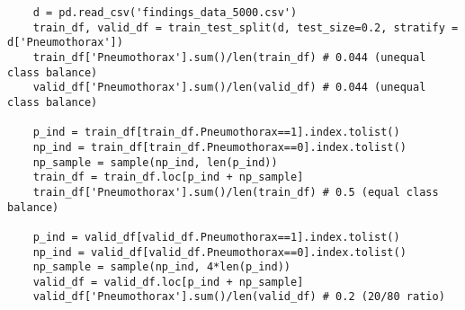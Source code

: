 \documentclass[11pt, a4paper]{article}
\begin{document}
	\begin{lstlisting}
	d = pd.read_csv('findings_data_5000.csv')
	train_df, valid_df = train_test_split(d, test_size=0.2, stratify = d['Pneumothorax'])
	train_df['Pneumothorax'].sum()/len(train_df) # 0.044 (unequal class balance)
	valid_df['Pneumothorax'].sum()/len(valid_df) # 0.044 (unequal class balance)
	
	p_ind = train_df[train_df.Pneumothorax==1].index.tolist()
	np_ind = train_df[train_df.Pneumothorax==0].index.tolist()
	np_sample = sample(np_ind, len(p_ind))
	train_df = train_df.loc[p_ind + np_sample]
	train_df['Pneumothorax'].sum()/len(train_df) # 0.5 (equal class balance)
	
	p_ind = valid_df[valid_df.Pneumothorax==1].index.tolist()
	np_ind = valid_df[valid_df.Pneumothorax==0].index.tolist()
	np_sample = sample(np_ind, 4*len(p_ind))
	valid_df = valid_df.loc[p_ind + np_sample]
	valid_df['Pneumothorax'].sum()/len(valid_df) # 0.2 (20/80 ratio) \end{lstlisting} \newpage

\end{document}
